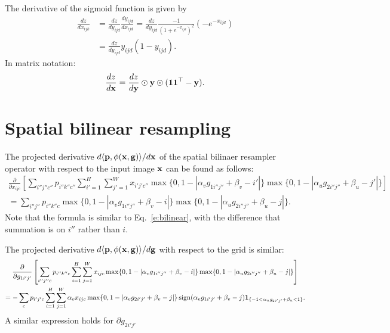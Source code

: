 The derivative of the sigmoid function is given by
\begin{align*}
\frac{dz}{dx_{ijk}}
&= 
\frac{dz}{d y_{ijd}} 
\frac{d y_{ijd}}{d x_{ijd}}
=
\frac{dz}{d y_{ijd}} 
\frac{-1}{(1+e^{-x_{ijd}})^2} ( - e^{-x_{ijd}})
\\
&=
\frac{dz}{d y_{ijd}} 
y_{ijd} (1 - y_{ijd}).
\end{align*}
In matrix notation:
\[
\frac{dz}{d\mathbf{x}} = \frac{dz}{d\mathbf{y}} \odot 
\mathbf{y} \odot 
(\mathbf{1}\mathbf{1}^\top - \mathbf{y}).
\]


\section{Spatial bilinear resampling}\label{s:impl-sampler}

The projected derivative $d\langle \mathbf{p}, \phi(\mathbf{x},\mathbf{g})\rangle / d\mathbf{x}$ of the spatial bilinaer resampler operator with respect to the input image $\mathbf{x}$ can be found as follows:
\begin{multline}\label{e:bilinear-back-x}
  \frac{\partial}{\partial x_{ijc}}
  \left[
  \sum_{i''j''c''}
  p_{i''k''c''}
  \sum_{i'=1}^H
  \sum_{j'=1}^W 
  x_{i'j'c''}
  \max\{0, 1-|\alpha_v g_{1i''j''} + \beta_v -i'|\}
  \max\{0, 1-|\alpha_u g_{2i''j''} + \beta_u -j'|\}
  \right]
  \\
=
  \sum_{i''j''}
  p_{i''k''c}
  \max\{0, 1-|\alpha_v g_{1i''j''} + \beta_v -i|\}
  \max\{0, 1-|\alpha_u g_{2i''j''} + \beta_u -j|\}.
\end{multline}
Note that the formula is similar to Eq.~\ref{e:bilinear}, with the difference that summation is on $i''$ rather than $i$.

The projected derivative $d\langle \mathbf{p}, \phi(\mathbf{x},\mathbf{g})\rangle / d\mathbf{g}$ with respect to the grid is similar:
\begin{multline}\label{e:bilinear-back-g}
  \frac{\partial}{\partial g_{1i'j'}}
  \left[
  \sum_{i''j''c}
  p_{i''k''c}
  \sum_{i=1}^H
  \sum_{j=1}^W 
  x_{ijc}
  \max\{0, 1-|\alpha_v g_{1i''j''} + \beta_v -i|\}
  \max\{0, 1-|\alpha_u g_{2i''j''} + \beta_u -j|\}
  \right]
  \\
=
  -
  \sum_c
  p_{i'j'c}
  \sum_{i=1}^H
  \sum_{j=1}^W
  \alpha_v x_{ijc}
  \max\{0, 1-|\alpha_v g_{2i'j'} + \beta_v -j|\}
  \sign(\alpha_v g_{1i'j'} + \beta_v -j)
  \mathbf{1}_{\{-1 < \alpha_u g_{2i'j'} + \beta_u < 1\}}.
\end{multline}
A similar expression holds for $\partial g_{2i'j'}$

